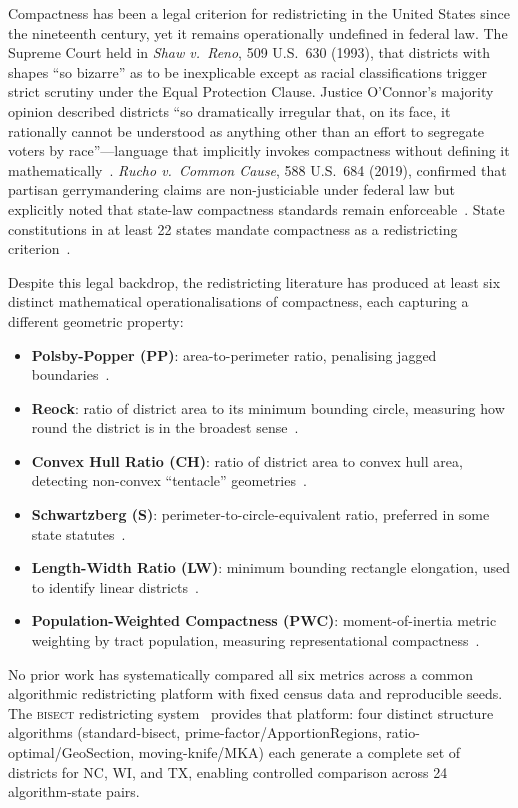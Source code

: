 Compactness has been a legal criterion for redistricting in the United States since
the nineteenth century, yet it remains operationally undefined in federal law.
The Supreme Court held in \textit{Shaw v.\ Reno}, 509 U.S.\ 630 (1993), that
districts with shapes ``so bizarre'' as to be inexplicable except as racial
classifications trigger strict scrutiny under the Equal Protection Clause.
Justice O'Connor's majority opinion described districts ``so dramatically irregular
that, on its face, it rationally cannot be understood as anything other than an
effort to segregate voters by race''---language that implicitly invokes compactness
without defining it mathematically~\citep{shaw1993}.
\textit{Rucho v.\ Common Cause}, 588 U.S.\ 684 (2019), confirmed that partisan
gerrymandering claims are non-justiciable under federal law but explicitly noted
that state-law compactness standards remain enforceable~\citep{rucho2019}.
State constitutions in at least 22 states mandate compactness as a redistricting
criterion~\citep{ncsl2021criteria}.

Despite this legal backdrop, the redistricting literature has produced at least
six distinct mathematical operationalisations of compactness, each capturing
a different geometric property:
\begin{itemize}
  \item \textbf{Polsby-Popper (PP)}: area-to-perimeter ratio, penalising jagged
    boundaries~\citep{polsby1991third}.
  \item \textbf{Reock}: ratio of district area to its minimum bounding circle,
    measuring how round the district is in the broadest sense~\citep{reock1961note}.
  \item \textbf{Convex Hull Ratio (CH)}: ratio of district area to convex hull area,
    detecting non-convex ``tentacle'' geometries~\citep{young1988measuring}.
  \item \textbf{Schwartzberg (S)}: perimeter-to-circle-equivalent ratio,
    preferred in some state statutes~\citep{schwartzberg1966reapportionment}.
  \item \textbf{Length-Width Ratio (LW)}: minimum bounding rectangle elongation,
    used to identify linear districts~\citep{niemi1990measuring}.
  \item \textbf{Population-Weighted Compactness (PWC)}: moment-of-inertia metric
    weighting by tract population, measuring representational compactness~\citep{fryer2011measuring}.
\end{itemize}

No prior work has systematically compared all six metrics across a common algorithmic
redistricting platform with fixed census data and reproducible seeds. The \textsc{bisect}
redistricting system~\citep{bisect2024} provides that platform: four distinct
structure algorithms (standard-bisect, prime-factor/ApportionRegions, ratio-optimal/GeoSection,
moving-knife/MKA) each generate a complete set of districts for NC, WI, and TX,
enabling controlled comparison across 24 algorithm-state pairs.

